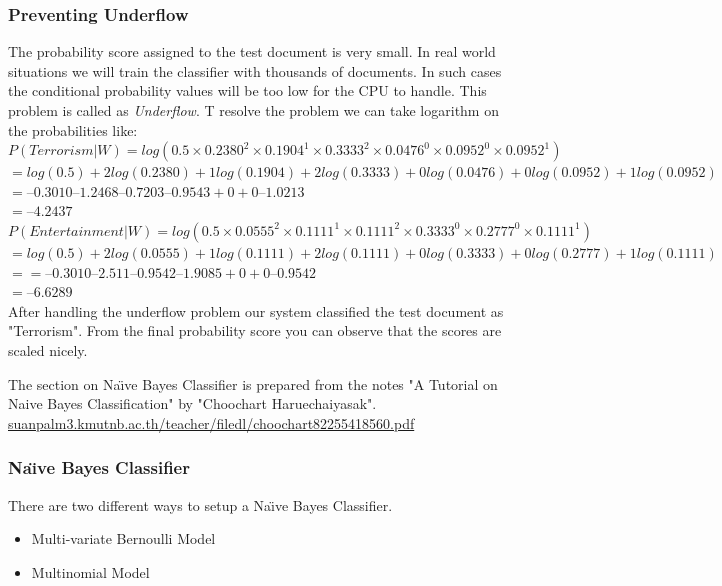 \documentclass[serif,11pt,aspectratio=1610,table]{beamer}
\begin{document}
\begin{frame}[fragile]
 \frametitle{Preventing Underflow}
 \small
 The probability score assigned to the test document is very small. In real world situations we will train the classifier with thousands of documents. In such cases the conditional probability values will be too low for the CPU to handle. This problem is called as \emph{Underflow}. T resolve the problem we can take logarithm on the probabilities like: \\
 \tiny
 $P(Terrorism | W) = log(0.5 \times 0.2380^{2} \times 0.1904^{1} \times 0.3333^{2} \times 0.0476^{0} \times 0.0952^{0} \times 0.0952^{1})$ \\
 $ = log(0.5) + 2 log(0.2380) + 1 log(0.1904) + 2 log(0.3333) + 0 log(0.0476) + 0 log(0.0952) + 1 log(0.0952) $ \\
 $ = – 0.3010 – 1.2468 – 0.7203 – 0.9543 + 0 + 0 – 1.0213 $ \\
 $ = – 4.2437 $ \\
 $ P( Entertainment | W) = log(0.5 \times 0.0555^{2} \times 0.1111^{1} \times 0.1111^{2} \times 0.3333^{0} \times 0.2777^{0} \times 0.1111^{1}) $ \\
 $ = log(0.5) + 2 log(0.0555) + 1 log(0.1111) + 2 log(0.1111) + 0 log(0.3333) + 0 log(0.2777) + 1 log(0.1111) $ \\
 $ = = – 0.3010 – 2.511 – 0.9542 – 1.9085 + 0 + 0 – 0.9542 $ \\
 $= – 6.6289$ \\
 \small
 After handling the underflow problem our system classified the test document as "Terrorism". From the final probability score you can observe that the scores are scaled nicely. 
 \begin{block}{}
  The section on Na\"{\i}ve Bayes Classifier is prepared from the notes "A Tutorial on Naive Bayes Classification" by "Choochart Haruechaiyasak". \url{suanpalm3.kmutnb.ac.th/teacher/filedl/choochart82255418560.pdf}
 \end{block}

\end{frame}


\begin{frame}[fragile]
 \frametitle{Na\"{\i}ve Bayes Classifier }
There are two different ways to setup a Na\"{\i}ve Bayes Classifier.
\begin{itemize}
 \item Multi-variate Bernoulli Model
 \item Multinomial Model
\end{itemize}

\end{frame}
\end{document}
